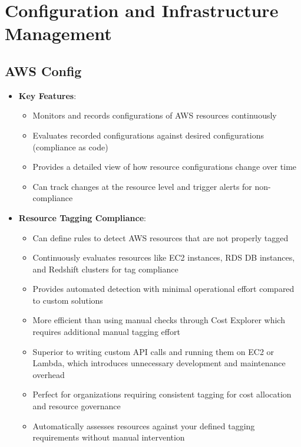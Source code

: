 \documentclass[11pt,a4paper]{report}
\begin{document}
\chapter{Configuration and Infrastructure Management}



\section{AWS Config}

\begin{itemize}
  \item \textbf{Key Features}:
\begin{itemize}
  \item Monitors and records configurations of AWS resources continuously
  \item Evaluates recorded configurations against desired configurations (compliance as code)
  \item Provides a detailed view of how resource configurations change over time
  \item Can track changes at the resource level and trigger alerts for non-compliance
\end{itemize}
  \item \textbf{Resource Tagging Compliance}:
\begin{itemize}
  \item Can define rules to detect AWS resources that are not properly tagged
  \item Continuously evaluates resources like EC2 instances, RDS DB instances, and Redshift clusters for tag compliance
  \item Provides automated detection with minimal operational effort compared to custom solutions
  \item More efficient than using manual checks through Cost Explorer which requires additional manual tagging effort
  \item Superior to writing custom API calls and running them on EC2 or Lambda, which introduces unnecessary development and maintenance overhead
  \item Perfect for organizations requiring consistent tagging for cost allocation and resource governance
  \item Automatically assesses resources against your defined tagging requirements without manual intervention
\end{itemize}
\end{itemize}
\end{document}
